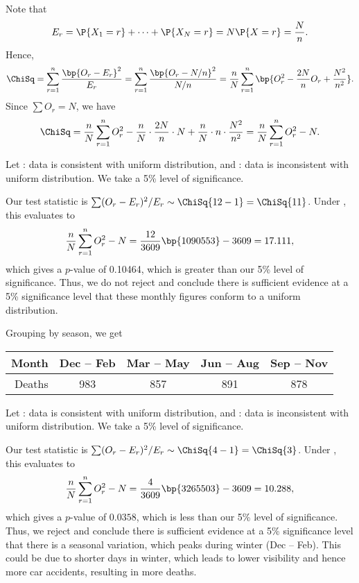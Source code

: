 \begin{solution}
    Note that \[E_r = \P{X_1 = r} + \dots + \P{X_N = r} = N \P{X = r} = \frac{N}{n}.\] Hence, \[\ChiSq = \sum_{r = 1}^n \frac{\bp{O_r - E_r}^2}{E_r} = \sum_{r = 1}^n \frac{\bp{O_r - N/n}^2}{N/n} = \frac{n}{N} \sum_{r = 1}^n \bp{O_r^2 - \frac{2N}{n} O_r + \frac{N^2}{n^2}}.\] Since $\sum O_r = N$, we have \[\ChiSq = \frac{n}{N} \sum_{r = 1}^n O_r^2 - \frac{n}{N} \cdot \frac{2N}{n} \cdot N + \frac{n}{N} \cdot n \cdot \frac{N^2}{n^2} = \frac{n}{N} \sum_{r = 1}^n O_r^2 - N.\]

    \begin{ppart}
        Let \nullhyp: data is consistent with uniform distribution, and \althyp: data is inconsistent with uniform distribution. We take a 5\% level of significance.

        Our test statistic is $\sum (O_r - E_r)^2/E_r \sim \ChiSq{12-1} = \ChiSq{11}$. Under \nullhyp, this evaluates to \[\frac{n}{N} \sum_{r = 1}^{n} O_r^2 - N = \frac{12}{3609} \bp{1090553} - 3609 = 17.111,\] which gives a $p$-value of 0.10464, which is greater than our 5\% level of significance. Thus, we do not reject \nullhyp{} and conclude there is sufficient evidence at a 5\% significance level that these monthly figures conform to a uniform distribution.
    \end{ppart}
    \begin{ppart}
        Grouping by season, we get
        \begin{table}[H]
            \centering
            \begin{tabular}{|r|c|c|c|c|}
            \hline
            Month & Dec -- Feb & Mar -- May & Jun -- Aug & Sep -- Nov \\ \hline
            Deaths & 983 & 857 & 891 & 878 \\ \hline
            \end{tabular}
        \end{table}

        Let \nullhyp: data is consistent with uniform distribution, and \althyp: data is inconsistent with uniform distribution. We take a 5\% level of significance.

        Our test statistic is $\sum (O_r - E_r)^2 / E_r \sim \ChiSq{4-1} = \ChiSq{3}$. Under \nullhyp, this evaluates to \[\frac{n}{N} \sum_{r = 1}^{n} O_r^2 - N = \frac{4}{3609} \bp{3265503} - 3609 = 10.288,\] which gives a $p$-value of $0.0358$, which is less than our 5\% level of significance. Thus, we reject \nullhyp{} and conclude there is sufficient evidence at a 5\% significance level that there is a seasonal variation, which peaks during winter (Dec -- Feb). This could be due to shorter days in winter, which leads to lower visibility and hence more car accidents, resulting in more deaths.
    \end{ppart}
\end{solution}

